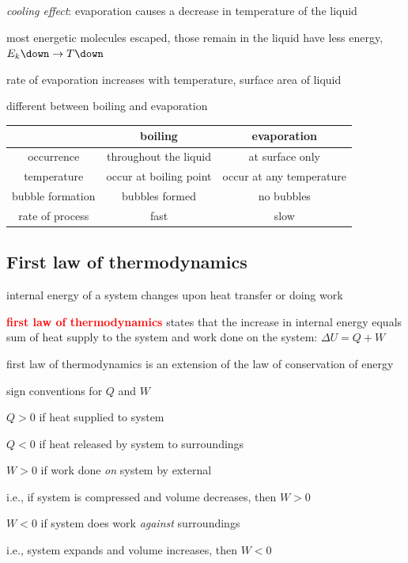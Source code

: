 \documentclass[a4paper,12pt]{book}
\newcommand{\cmt}{}
\newenvironment{ilight}
  {\centering
  	\vspace*{6pt}
  	\begin{tcolorbox}[colframe=Gray,colback=LightGrey!15]
  \setlength{\baselineskip}{\baselineskip}%
  }
  {\end{tcolorbox}\vspace*{-4pt}}
\newcommand{\keypoint}[1]{\textbf{\textcolor{red}{#1}}}
\newcommand{\ra}{\rightarrow}
\newcommand{\tcbhighmath}[1]{\boxed{#1}}
\newcommand{\keypoint}[1]{\textbf{\textcolor{red}{#1}}}
\newcommand{\cmt}{}
\begin{document}
\cmt \emph{cooling effect}: evaporation causes a decrease in temperature of the liquid

most energetic molecules escaped, those remain in the liquid have less energy, $E_k \down \ra T \down$

\cmt rate of evaporation increases with temperature, surface area of liquid

\cmt different between boiling and evaporation

\begin{center}
	\begin{tabular}{|c|c|c|}
		\hline 
		& boiling & evaporation \\ 
		\hline 
		occurrence & throughout the liquid & at surface only \\ 
		\hline 
		temperature & occur at boiling point & occur at any temperature \\ 
		\hline 
		bubble formation & bubbles formed & no bubbles \\ 
		\hline 
		rate of process & fast & slow \\ 
		\hline 
	\end{tabular} 
\end{center}

\subsection{First law of thermodynamics}

internal energy of a system changes upon heat transfer or doing work

\begin{ilight}
	\keypoint{first law of thermodynamics} states that the increase in internal energy equals sum of heat supply to the system and work done on the system: $\tcbhighmath{\Delta U = Q +  W}$
\end{ilight}

\cmt first law of thermodynamics is an extension of the law of conservation of energy

\cmt sign conventions for $Q$ and $W$

\begin{compactitem}
	\item[$\circ$] $Q>0$ if heat supplied to system
	
	\item[$\circ$] $Q<0$ if heat released by system to surroundings
	
	\item[$\circ$] $W>0$ if work done \emph{on} system by external
	
	i.e., if system is compressed and volume decreases, then $W>0$
	
	\item[$\circ$] $W<0$ if system does work \emph{against} surroundings
	
	i.e., system expands and volume increases, then $W<0$
	
\end{compactitem}
\end{document}
